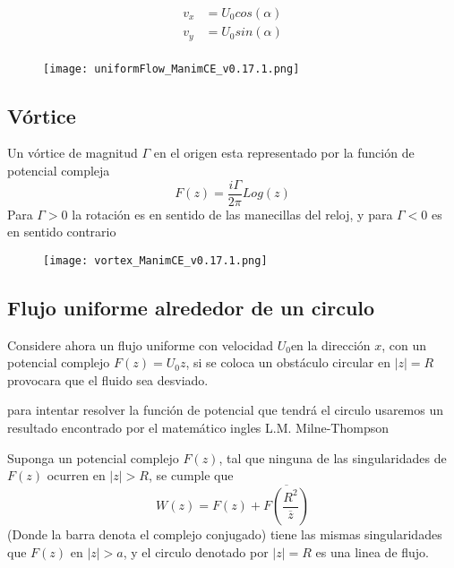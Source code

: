 \documentclass[12pt]{article}
\begin{document}
			\begin{equation}
				\begin{split}
				v_x &= U_0 cos(\alpha)\\
				v_y &= U_0 sin(\alpha)\\
				\end{split}
			\end{equation}
			\begin{figure}[!h]
				\begin{small}
					\begin{center}
						\texttt{[image: uniformFlow\_ManimCE\_v0.17.1.png]}
					\end{center}
					\caption{}
					\label{fig:}
				\end{small}
			\end{figure}
			

		\subsection{Vórtice}
			Un vórtice de magnitud $\Gamma $ en el origen esta representado por la función de potencial compleja
			\begin{equation}
				F(z)= \frac{i\Gamma}{2 \pi} Log(z)
			\end{equation}
			Para $\Gamma>0$ la rotación es en sentido de las manecillas del reloj, y para $\Gamma<0$ es en sentido contrario
			\begin{figure}[!h]
				\begin{small}
					\begin{center}
						\texttt{[image: vortex\_ManimCE\_v0.17.1.png]}
					\end{center}
					\caption{}
					\label{fig:}
				\end{small}
			\end{figure}
			

		\subsection{Flujo uniforme alrededor de un circulo }
		Considere ahora un flujo uniforme con velocidad $U_0$en la dirección $x$, con un potencial complejo $F(z)= U_0 z$, si se coloca un obstáculo circular en $|z| =R$ provocara que el fluido sea desviado.
		
		para intentar resolver la función de potencial que tendrá el circulo usaremos un resultado encontrado por el matemático ingles L.M. Milne-Thompson 
		\begin{theorem}
			Suponga un potencial complejo $F(z)$, tal que ninguna de las singularidades de $F(z)$ ocurren en $|z|>R$, se cumple que
			\begin{equation}
				W(z) = F(z) + \overline{F \left( \frac{R^2}{\overline{z} }\right)} 
				\label{Teorema_del_circulo}
			\end{equation}
			(Donde la barra denota el complejo conjugado) tiene las mismas singularidades que $F(z)$ en $|z|>a $, y el circulo denotado por $|z|= R $ es una linea de flujo.
		\end{theorem}
		
\end{document}
